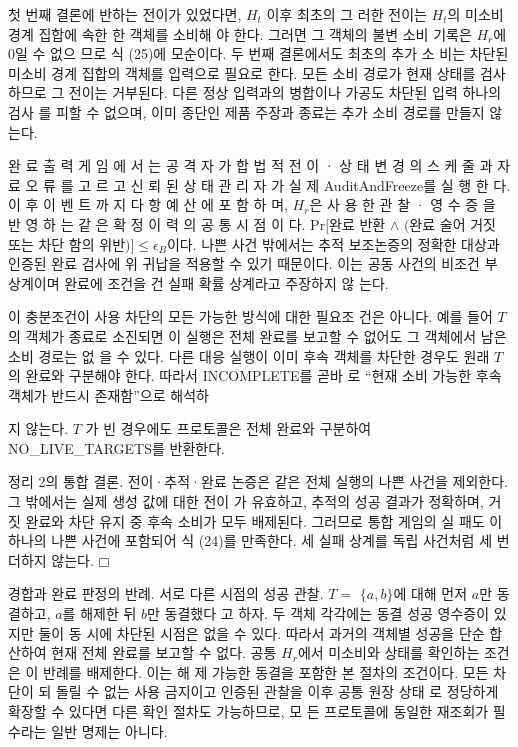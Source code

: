 첫 번째 결론에 반하는 전이가 있었다면, \(H_{t}\) 이후 최초의 그
러한 전이는 \(H_{t}\)의 미소비 경계 집합에 속한 한 객체를 소비해
야 한다. 그러면 그 객체의 불변 소비 기록은 \(H_{r}\)에 0일 수 없으
므로 식 (25)에 모순이다. 두 번째 결론에서도 최초의 추가 소
비는 차단된 미소비 경계 집합의 객체를 입력으로 필요로 한다.
모든 소비 경로가 현재 상태를 검사하므로 그 전이는 거부된다.
다른 정상 입력과의 병합이나 가공도 차단된 입력 하나의 검사
를 피할 수 없으며, 이미 종단인 제품 주장과 종료는 추가 소비
경로를 만들지 않는다.

완 료 출 력 게 임 에 서 는 공 격 자 가 합 법 적 전 이 · 상 태 변
경 의 스 케 줄 과 자 료 오 류 를 고 르 고 신 뢰 된 상 태 관 리 자
가 실 제 AuditAndFreeze를 실 행 한 다. 이 후 이 벤 트 까 지
다 항 예 산 에 포 함 하 며, \(H_{r}\)은 사 용 한 관 찰 · 영 수 증 을 반
영 하 는 같 은 확 정 이 력 의 공 통 시 점 이 다. Pr\([\)완료 반환 \(∧\)
    \((\)완료 술어 거짓 또는 차단 함의 위반\()]≤\epsilon _{B}\)이다. 나쁜 사건
밖에서는 추적 보조논증의 정확한 대상과 인증된 완료 검사에
위 귀납을 적용할 수 있기 때문이다. 이는 공동 사건의 비조건
부 상계이며 완료에 조건을 건 실패 확률 상계라고 주장하지 않
는다.

이 충분조건이 사용 차단의 모든 가능한 방식에 대한 필요조
건은 아니다. 예를 들어 \(T\) 의 객체가 종료로 소진되면 이 실행은
전체 완료를 보고할 수 없어도 그 객체에서 남은 소비 경로는 없
을 수 있다. 다른 대응 실행이 이미 후속 객체를 차단한 경우도
원래 \(T\) 의 완료와 구분해야 한다. 따라서 INCOMPLETE를 곧바
로 “현재 소비 가능한 후속 객체가 반드시 존재함”으로 해석하

지 않는다. \(T\) 가 빈 경우에도 프로토콜은 전체 완료와 구분하여
NO\_LIVE\_TARGETS를 반환한다.

정리 2의 통합 결론. 전이·추적·완료 논증은 같은 전체 실행의
나쁜 사건을 제외한다. 그 밖에서는 실제 생성 값에 대한 전이
가 유효하고, 추적의 성공 결과가 정확하며, 거짓 완료와 차단
유지 중 후속 소비가 모두 배제된다. 그러므로 통합 게임의 실
패도 이 하나의 나쁜 사건에 포함되어 식 (24)를 만족한다. 세
실패 상계를 독립 사건처럼 세 번 더하지 않는다. \(□\)

경합과 완료 판정의 반례. 서로 다른 시점의 성공 관찰. \(T=\)
\(\{a,b\}\)에 대해 먼저 \(a\)만 동결하고, \(a\)를 해제한 뒤 \(b\)만 동결했다
고 하자. 두 객체 각각에는 동결 성공 영수증이 있지만 둘이 동
시에 차단된 시점은 없을 수 있다. 따라서 과거의 객체별 성공을
단순 합산하여 현재 전체 완료를 보고할 수 없다. 공통 \(H_{r}\)에서
미소비와 상태를 확인하는 조건은 이 반례를 배제한다. 이는 해
제 가능한 동결을 포함한 본 절차의 조건이다. 모든 차단이 되
돌릴 수 없는 사용 금지이고 인증된 관찰을 이후 공통 원장 상태
로 정당하게 확장할 수 있다면 다른 확인 절차도 가능하므로, 모
든 프로토콜에 동일한 재조회가 필수라는 일반 명제는 아니다.

